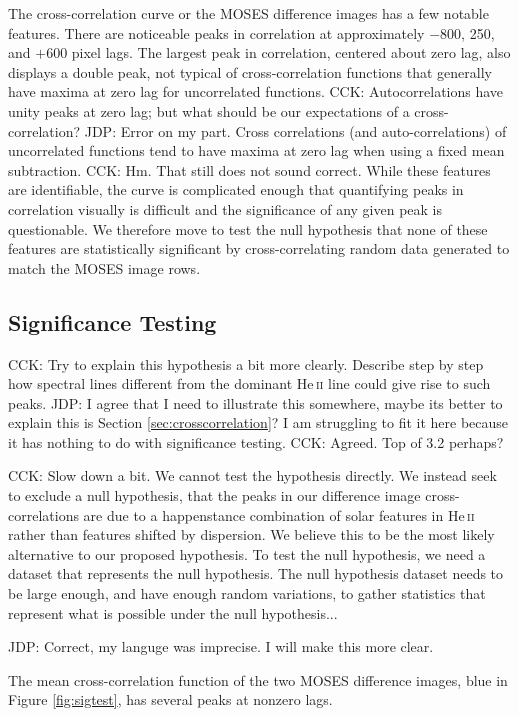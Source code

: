 \documentclass[]{solarphysics}
\newcommand{\cck}[1]{{\color{red} CCK: #1}} %
\newcommand{\jdp}[1]{{\color{blue} JDP: #1}} %
\begin{document}
\begin{article}
	 The cross-correlation curve or the MOSES difference images has a few notable features.  There are noticeable peaks in correlation  at approximately $-800$, 250, and $+600$ pixel lags.  The largest peak in correlation, centered about zero lag, also displays a double peak, not typical of cross-correlation functions that generally have  maxima at zero lag for uncorrelated functions. \cck{Autocorrelations have unity peaks at zero lag; but what should be our expectations of a cross-correlation?} \jdp{Error on my part.  Cross correlations (and auto-correlations) of uncorrelated functions tend to have maxima at zero lag when using a fixed mean subtraction.} \cck{Hm. That still does not sound correct.}  While these features are identifiable, the curve is complicated enough that quantifying peaks in correlation visually is difficult and the significance of any given peak is questionable. We therefore move to test the null hypothesis that none of these features are statistically significant by cross-correlating random data generated to match the MOSES image rows.
 
	
	\subsection{Significance Testing}
	\label{sec:sigtesting}
	 \cck{Try to explain this hypothesis a bit more clearly. Describe step by step how spectral lines different from the dominant He\,\textsc{ii} line could give rise to such peaks.} 
	 \jdp{I agree that I need to illustrate this somewhere,  maybe its better to explain this is Section \ref{sec:crosscorrelation}?  I am struggling to fit it here because it has nothing to do with significance testing.} \cck{Agreed. Top of 3.2 perhaps?}
	 
	 \cck{Slow down a bit. We cannot test the hypothesis directly. We instead seek to exclude a null hypothesis, that the peaks in our difference image cross-correlations are due to a happenstance combination of solar features in He\,\textsc{ii} rather than features shifted by dispersion. We believe this to be the most likely alternative to our proposed hypothesis. To test the null hypothesis, we need a dataset that represents the null hypothesis. The null hypothesis dataset needs to be large enough, and have enough random variations, to gather statistics that represent what is possible under the null hypothesis...}
	 
	 \jdp{Correct, my languge was imprecise.  I will make this more clear.}
	
	The mean cross-correlation function of the two MOSES difference images, blue in Figure \ref{fig:sigtest}, has several peaks at nonzero lags.  
	

\end{article}
\end{document}
